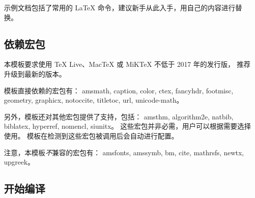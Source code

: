 \documentclass[a4paper]{ltxdoc}
\DeclareRobustCommand\pkg{\textsf}
\begin{document}
示例文档包括了常用的 \LaTeX{} 命令，建议新手从此入手，用自己的内容进行替换。


\subsection{依赖宏包}

本模板要求使用 TeX Live、MacTeX 或 MiKTeX 不低于 2017 年的发行版，
推荐升级到最新的版本。

模板直接依赖的宏包有：
\pkg{amsmath},
\pkg{caption},
\pkg{color},
\pkg{ctex},
\pkg{fancyhdr},
\pkg{footmisc},
\pkg{geometry},
\pkg{graphicx},
\pkg{notoccite},
\pkg{titletoc},
\pkg{url},
\pkg{unicode-math}。

另外，模板还对其他宏包提供了支持，包括：
\pkg{amsthm},
\pkg{algorithm2e},
\pkg{natbib},
\pkg{biblatex},
\pkg{hyperref},
\pkg{nomencl},
\pkg{siunitx}。
这些宏包并非必需，用户可以根据需要选择使用。
模板在检测到这些宏包被调用后会自动进行配置。

注意，本模板\emph{不}兼容的宏包有：
\pkg{amsfonts},
\pkg{amssymb},
\pkg{bm},
\pkg{cite},
\pkg{mathrsfs},
\pkg{newtx},
\pkg{upgreek}。


\subsection{开始编译}
\end{document}
